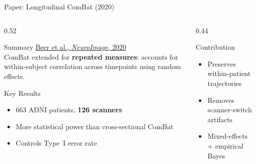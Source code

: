 \documentclass[aspectratio=169,xcolor=dvipsnames]{beamer}
\begin{document}
\begin{frame}{Paper: Longitudinal ComBat (2020)}
    \begin{columns}
        \begin{column}{0.52\textwidth}
            \begin{block}{Summary}
                \small
                \href{https://doi.org/10.1016/j.neuroimage.2020.117129}{Beer et al., \textit{NeuroImage}, 2020}\\[0.3em]
                ComBat extended for \textbf{repeated measures}: accounts for within-subject correlation across timepoints using random effects.
            \end{block}

            \vspace{0.2em}

            \begin{block}{Key Results}
                \small
                \begin{itemize}
                    \item 663 ADNI patients, \textbf{126 scanners}
                    \item More statistical power than cross-sectional ComBat
                    \item Controls Type~I error rate
                \end{itemize}
            \end{block}
        \end{column}

        \begin{column}{0.44\textwidth}
            \begin{block}{Contribution}
                \small
                \begin{itemize}
                    \item Preserves within-patient trajectories
                    \item Removes scanner-switch artifacts
                    \item Mixed-effects + empirical Bayes
                \end{itemize}
            \end{block}

            \vspace{0.2em}


\end{column}
\end{columns}
\end{frame}
\end{document}
